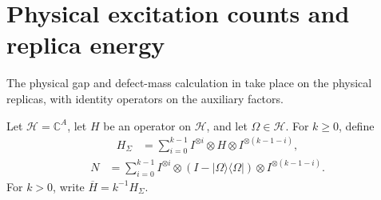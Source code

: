 \section{Physical excitation counts and replica energy}
\label{sec:replica_defect}

The physical gap and defect-mass calculation in
\cite[Section~7]{OpenAI2026AreaLaw} take place on the physical replicas,
with identity operators on the auxiliary factors.

\begin{definition}
\label{def:replica_operators}
\leanok
Let $\mathcal H=\mathbb C^A$, let $H$ be an operator on $\mathcal H$,
and let $\Omega\in\mathcal H$. For $k\ge0$, define
\begin{align}
 H_\Sigma&=\sum_{i=0}^{k-1} I^{\otimes i}\otimes H\otimes I^{\otimes(k-1-i)},
 \label{eq:replica_hamiltonian}
\end{align}
\begin{align}
 N&=\sum_{i=0}^{k-1} I^{\otimes i}\otimes
       (I-|\Omega\rangle\langle\Omega|)\otimes I^{\otimes(k-1-i)}.
 \label{eq:replica_defect}
\end{align}
For $k>0$, write $\overline H=k^{-1}H_\Sigma$.
\end{definition}

